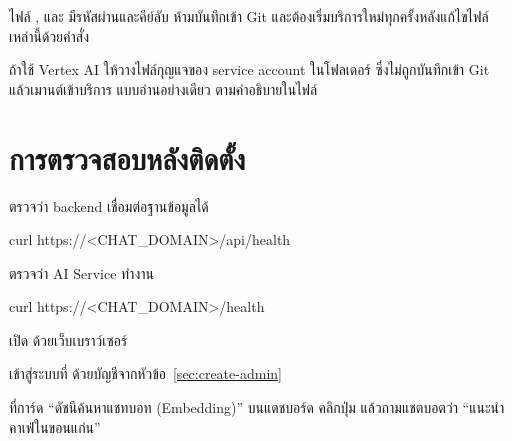 \begin{warning}
ไฟล์ ,  และ  มีรหัสผ่านและคีย์ลับ ห้ามบันทึกเข้า Git และต้องเริ่มบริการใหม่ทุกครั้งหลังแก้ไขไฟล์เหล่านี้ด้วยคำสั่ง 
\end{warning}

ถ้าใช้ Vertex AI ให้วางไฟล์กุญแจของ service account ในโฟลเดอร์  ซึ่งไม่ถูกบันทึกเข้า Git แล้วเมานต์เข้าบริการ  แบบอ่านอย่างเดียว ตามคำอธิบายในไฟล์ 

\section{การตรวจสอบหลังติดตั้ง}
\label{sec:verify}

\begin{steps}
  \item ตรวจว่า backend เชื่อมต่อฐานข้อมูลได้
\begin{terminal}
curl https://<CHAT_DOMAIN>/api/health
\end{terminal}
  \item ตรวจว่า AI Service ทำงาน
\begin{terminal}
curl https://<CHAT_DOMAIN>/health
\end{terminal}
  \item เปิด  ด้วยเว็บเบราว์เซอร์
  \item เข้าสู่ระบบที่  ด้วยบัญชีจากหัวข้อ~\ref{sec:create-admin}
  \item ที่การ์ด ``ดัชนีค้นหาแชทบอท (Embedding)'' บนแดชบอร์ด คลิกปุ่ม  แล้วถามแชตบอตว่า ``แนะนำคาเฟ่ในขอนแก่น''
\end{steps}
